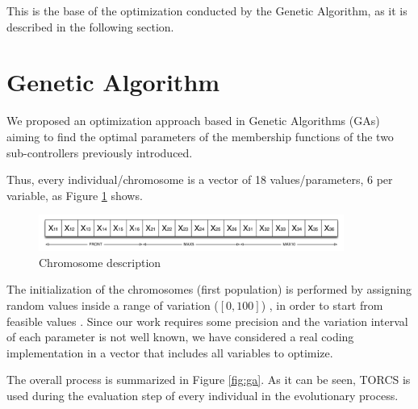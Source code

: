 \documentclass[conference]{IEEEtran}
\begin{document}
This is the base of the optimization conducted by the Genetic Algorithm, as it is described in the following section.



\section{Genetic Algorithm}
\label{sec:GA_optimization}

We proposed an optimization approach based in Genetic Algorithms (GAs) \cite{GAs_Goldberg89} aiming to find the optimal parameters of the membership functions of the two sub-controllers previously introduced. 

Thus, every individual/chromosome is a vector of 18 values/parameters, 6 per variable, as Figure \ref {fig:cromosome} shows.

\begin{figure}[!ht]	
  \begin{center}
    \includegraphics[width=10cm]{fig/chromosome2.png}
    \caption{Chromosome description}
    \label{fig:cromosome}	
  \end{center}	
\end{figure}

The initialization of the chromosomes (first population) is performed by assigning random values inside a range of variation ($[0,100]$)
\cite{GAs_Goldberg89}, in order to start from feasible values
\cite{salem_evo17}. Since our work requires some precision and the variation interval of each parameter is not well known, we have considered a real coding
implementation \cite{elsayed13} in a vector that includes all variables to optimize.

The overall process is summarized in Figure \ref{fig:ga}. As it can be seen, TORCS is used during the evaluation step of every individual in the evolutionary process.
\end{document}
